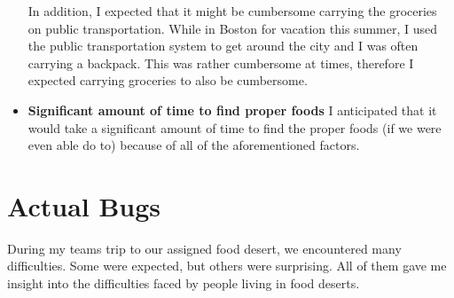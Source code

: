 \documentclass[11pt]{article}
\begin{document}
\begin{itemize}
        In addition, I expected that it might be cumbersome carrying the groceries on public
        transportation. While in Boston for vacation this summer, I used the public transportation
        system to get around the city and I was often carrying a backpack. This was rather
        cumbersome at times, therefore I expected carrying groceries to also be cumbersome.

    \item \textbf{Significant amount of time to find proper foods} I anticipated that it would take
        a significant amount of time to find the proper foods (if we were even able do to) because
        of all of the aforementioned factors.
\end{itemize}

\section{Actual Bugs}
During my teams trip to our assigned food desert, we encountered many difficulties. Some were
expected, but others were surprising. All of them gave me insight into the difficulties faced by
people living in food deserts.
\end{document}
